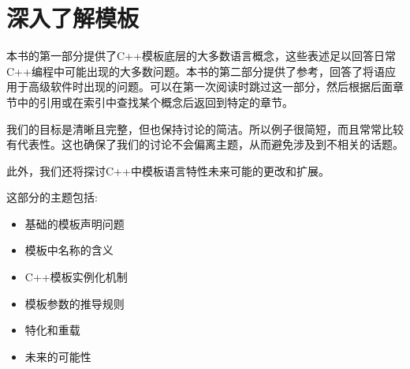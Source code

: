 \part{深入了解模板}

本书的第一部分提供了C++模板底层的大多数语言概念，这些表述足以回答日常C++编程中可能出现的大多数问题。本书的第二部分提供了参考，回答了将语应用于高级软件时出现的问题。可以在第一次阅读时跳过这一部分，然后根据后面章节中的引用或在索引中查找某个概念后返回到特定的章节。

我们的目标是清晰且完整，但也保持讨论的简洁。所以例子很简短，而且常常比较有代表性。这也确保了我们的讨论不会偏离主题，从而避免涉及到不相关的话题。

此外，我们还将探讨C++中模板语言特性未来可能的更改和扩展。

这部分的主题包括:

\begin{itemize}
  \item 基础的模板声明问题
  \item 模板中名称的含义
  \item C++模板实例化机制
  \item 模板参数的推导规则
  \item 特化和重载
  \item 未来的可能性
\end{itemize}







